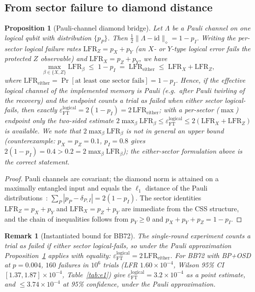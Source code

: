 \documentclass[pdflatex,sn-mathphys-num]{sn-jnl}
\theoremstyle{thmstyleone}
\newtheorem{proposition}[theorem]{Proposition}
\theoremstyle{thmstyletwo}
\newtheorem{remark}{Remark}
\theoremstyle{thmstylethree}
\begin{document}
\subsection{From sector failure to diamond distance}

\begin{proposition}[Pauli-channel diamond bridge]\label{prop:bridge}
Let $\Lambda$ be a Pauli channel on one logical qubit with distribution $\{p_P\}$. Then $\tfrac12\|\Lambda-\mathrm{id}\|_\diamond=1-p_I$. Writing the per-sector logical failure rates $\mathrm{LFR}_Z=p_X+p_Y$ (an $X$- or $Y$-type logical error fails the protected $Z$ observable) and $\mathrm{LFR}_X=p_Z+p_Y$, we have
\begin{equation}
\max_{\beta\in\{X,Z\}}\mathrm{LFR}_\beta
\;\le\;1-p_I\;=\;\mathrm{LFR}_{\mathrm{either}}
\;\le\;\mathrm{LFR}_X+\mathrm{LFR}_Z,
\end{equation}
where $\mathrm{LFR}_{\mathrm{either}}=\Pr[\text{at least one sector fails}]=1-p_I$. Hence, if the effective logical channel of the implemented memory is Pauli (e.g.\ after Pauli twirling of the recovery) \emph{and the endpoint counts a trial as failed when either sector logical-fails}, then exactly $\varepsilon_{\mathrm{FT}}^{\mathrm{logical}}=2(1-p_I)= 2\,\mathrm{LFR}_{\mathrm{either}}$; with a per-sector ($\max$) endpoint only the two-sided estimate $2\max_\beta\mathrm{LFR}_\beta\le \varepsilon_{\mathrm{FT}}^{\mathrm{logical}}\le 2(\mathrm{LFR}_X+\mathrm{LFR}_Z)$ is available. We note that $2\max_\beta\mathrm{LFR}_\beta$ is not in general an upper bound (counterexample: $p_X=p_Z=0.1$, $p_I=0.8$ gives $2(1-p_I)=0.4>0.2=2\max_\beta\mathrm{LFR}_\beta$); the either-sector formulation above is the correct statement.
\end{proposition}
\begin{proof}
Pauli channels are covariant; the diamond norm is attained on a maximally entangled input and equals the $\ell_1$ distance of the Pauli distributions~\cite{Watrous2018}: $\sum_P|p_P-\delta_{P,I}|=2(1-p_I)$. The sector identities $\mathrm{LFR}_Z=p_X+p_Y$ and $\mathrm{LFR}_X=p_Z+p_Y$ are immediate from the CSS structure, and the chain of inequalities follows from $p_Y\ge0$ and $p_X+p_Y+p_Z=1-p_I$.
\end{proof}
\begin{remark}[Instantiated bound for BB72]\label{rem:bridge-number}
The single-round experiment counts a trial as failed if either sector logical-fails, so under the Pauli approximation Proposition~\ref{prop:bridge} applies with equality: $\varepsilon_{\mathrm{FT}}^{\mathrm{logical}}= 2\,\mathrm{LFR}_{\mathrm{either}}$. For BB72 with BP+OSD at $p=0.004$, $160$ failures in $10^{6}$ trials (LFR $1.60\times10^{-4}$, Wilson 95\% CI $[1.37,1.87]\times10^{-4}$, Table~\ref{tab:e1}) give $\varepsilon_{\mathrm{FT}}^{\mathrm{logical}}=3.2\times10^{-4}$ as a point estimate, and $\le3.74\times10^{-4}$ at 95\% confidence, under the Pauli approximation.
\end{remark}
\end{document}
